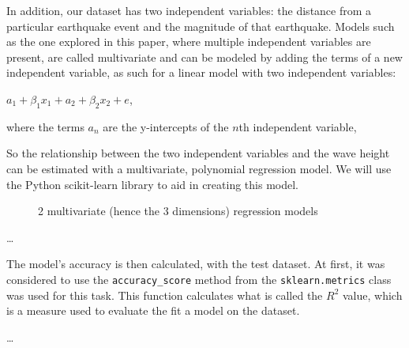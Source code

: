 \documentclass[11pt,letterpaper]{article}
\begin{document}
In addition, our dataset has two independent variables: the distance from a particular
earthquake event and the magnitude of that earthquake. Models such as the one explored 
in this paper, where multiple independent variables are present, are called multivariate 
and can be modeled by adding the terms of a new independent variable, as such 
for a linear model with two independent variables:

$a_1 + \beta_1 x_1 + a_2 + \beta_2 x_2 + e$, 

where the terms $a_n$ are the y-intercepts of the $n$th independent variable, 


So the relationship between the two independent variables and the wave height can
be estimated with a multivariate, polynomial regression model. We will use the Python
scikit-learn library to aid in creating this model.

\begin{figure}[h]
    \centering
    \qquad
    \caption{2 multivariate (hence the 3 dimensions) regression models}
    \label{fig:example}
\end{figure}


\dots

The model's accuracy is then calculated, with the test dataset. At first, it was considered 
to use the \verb|accuracy_score| method from the \verb|sklearn.metrics| class was used for 
this task. This function calculates what is called the $R^2$ value, which is a measure used to 
evaluate the fit a model on the dataset. 

\dots
\end{document}
